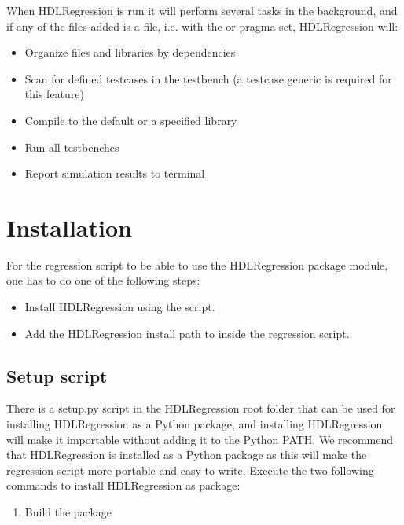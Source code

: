\documentclass[letterpaper,10pt,english]{sphinxmanual}
\begin{document}
\sphinxAtStartPar
When HDLRegression is run it will perform several tasks in the background, and if any of the files added is a {\hyperref[\detokenize{intro:testbench}]{}} file,
i.e. with the   or   pragma set, HDLRegression will:
\begin{itemize}
\item {} 
\sphinxAtStartPar
Organize files and libraries by dependencies

\item {} 
\sphinxAtStartPar
Scan for defined testcases in the testbench (a testcase generic is required for this feature)

\item {} 
\sphinxAtStartPar
Compile to the default or a specified library

\item {} 
\sphinxAtStartPar
Run all testbenches

\item {} 
\sphinxAtStartPar
Report simulation results to terminal

\end{itemize}


\chapter{Installation}
\label{\detokenize{intro:installation}}
\sphinxAtStartPar
For the regression script to be able to use the HDLRegression package module,
one has to do one of the following steps:
\begin{itemize}
\item {} 
\sphinxAtStartPar
Install HDLRegression using the {\hyperref[\detokenize{intro:setup-py}]{}} script.

\item {} 
\sphinxAtStartPar
Add the HDLRegression install path to {\hyperref[\detokenize{intro:python-path}]{}} inside the regression script.

\end{itemize}


\section{Setup script}
\label{\detokenize{intro:setup-script}}\label{\detokenize{intro:setup-py}}
\sphinxAtStartPar
There is a setup.py script in the HDLRegression root folder that can be used for installing HDLRegression as a
Python package, and installing HDLRegression will make it importable without adding it to the Python PATH.
We recommend that HDLRegression is installed as a Python package as this will make the regression script more
portable and easy to write.
Execute the two following commands to install HDLRegression as package:
\begin{enumerate}
%
\item {} 
\sphinxAtStartPar
Build the package

\end{enumerate}
\end{document}
